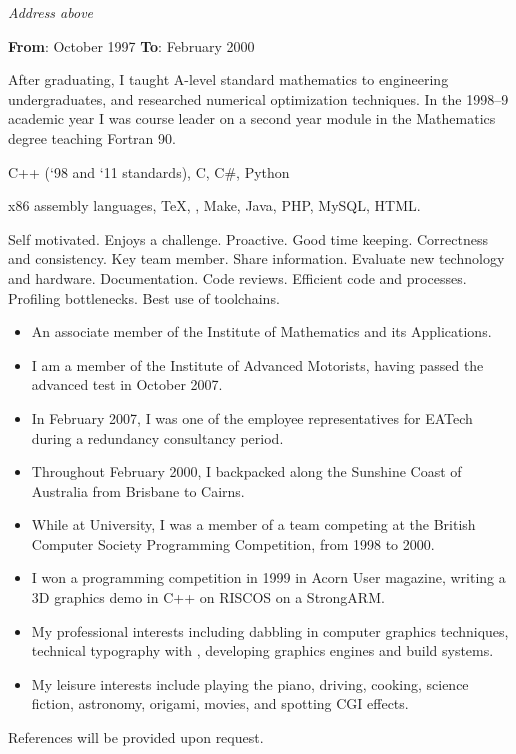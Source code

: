 \documentclass[a4paper,12pt]{article}
\newcommand{\cvheading}[1]{{\medskip\noindent\hspace{-5mm}{\sc #1}\par}}
\newcommand{\place}[2]{\vspace*{1ex}{\noindent\bf #1}\hfill{\it #2}\par}
\newcommand{\fromto}[2]{{\bf From}: #1 {\bf To}: #2\par}
\begin{document}
\place{University of Hertfordshire}{Address above}
\fromto{October 1997}{February 2000}
After graduating, I taught A-level standard mathematics to engineering undergraduates, and researched numerical optimization techniques. In the 1998--9 academic year I was course leader on a second year module in the Mathematics degree teaching Fortran 90.

\pagebreak

\cvheading{Main programming languages}
C++ (`98 and `11 standards), C, C\#, Python

\cvheading{Additional language experiences}
x86 assembly languages, \TeX, \LaTeXe, Make, Java, PHP, MySQL, HTML.

\cvheading{Key skills}
Self motivated. Enjoys a challenge. Proactive. Good time keeping. Correctness and consistency. Key team member. Share information. Evaluate new technology and hardware. Documentation. Code reviews. Efficient code and processes. Profiling bottlenecks. Best use of toolchains.

\cvheading{Interests, Responsibilities and Notable Achievements}
\begin{itemize}
\item An associate member of the Institute of Mathematics and its Applications.
\item I am a member of the Institute of Advanced Motorists, having passed the advanced test in October 2007.
\item In February 2007, I was one of the employee representatives for EATech during a redundancy consultancy period.
\item Throughout February 2000, I backpacked along the Sunshine Coast of Australia from Brisbane to Cairns.
\item While at University, I was a member of a team competing at the British Computer Society Programming Competition, from 1998 to 2000.
\item I won a programming competition in 1999 in Acorn User magazine, writing a 3D graphics demo in C++ on RISCOS on a StrongARM.
\item My professional interests including dabbling in computer graphics techniques, technical typography with \LaTeXe, developing graphics engines and build systems.
\item My leisure interests include playing the piano, driving, cooking, science fiction, astronomy, origami, movies, and spotting CGI effects.
\end{itemize}

\cvheading{References}
References will be provided upon request.
\end{document}
